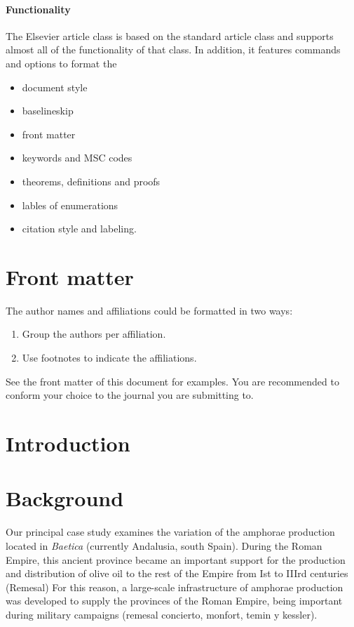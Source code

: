 \documentclass[review, twocolumn]{elsarticle}
\begin{document}
\paragraph{Functionality} The Elsevier article class is based on the standard article class and supports almost all of the functionality of that class. In addition, it features commands and options to format the
\begin{itemize}
\item document style
\item baselineskip
\item front matter
\item keywords and MSC codes
\item theorems, definitions and proofs
\item lables of enumerations
\item citation style and labeling.
\end{itemize}

\section{Front matter}

The author names and affiliations could be formatted in two ways:
\begin{enumerate}[(1)]
\item Group the authors per affiliation.
\item Use footnotes to indicate the affiliations.
\end{enumerate}
See the front matter of this document for examples. You are recommended to conform your choice to the journal you are submitting to.
\section{Introduction}

\section{Background}

Our principal case study examines the variation of the amphorae production located in \emph{Baetica} (currently Andalusia, south Spain). During the Roman Empire, this ancient province became an important support for the production and distribution of  olive oil to the rest of the Empire from Ist to IIIrd centuries (Remesal)
For this reason, a large-scale infrastructure of amphorae production was developed to supply the provinces of the Roman Empire, being important during military campaigns (remesal concierto, monfort, temin y kessler).
\end{document}

